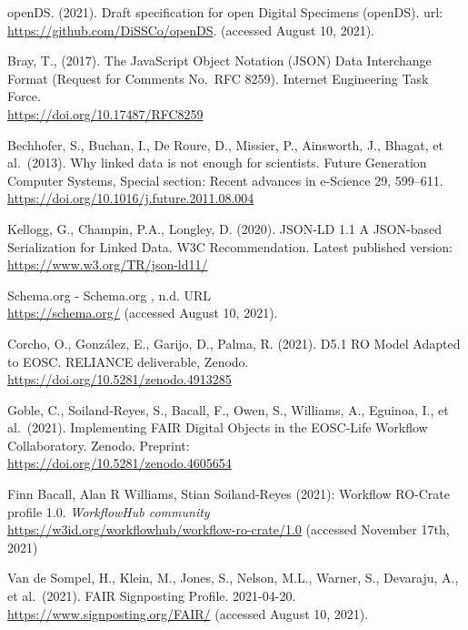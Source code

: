 \begin{thebibliography}{9}
 openDS. (2021). Draft specification for open Digital Specimens
(openDS). url:\\
\url{https://github.com/DiSSCo/openDS}. (accessed August 10, 2021).

 Bray, T., (2017). The JavaScript Object Notation (JSON) Data
Interchange Format (Request for Comments No.~RFC 8259). Internet
Engineering Task Force.\\
\url{https://doi.org/10.17487/RFC8259}

 Bechhofer, S., Buchan, I., De Roure, D., Missier, P.,
Ainsworth, J., Bhagat, et al.~(2013). Why linked data is not enough for
scientists. Future Generation Computer Systems, Special section: Recent
advances in e-Science 29, 599--611.\\
\url{https://doi.org/10.1016/j.future.2011.08.004}

 Kellogg, G., Champin, P.A., Longley, D. (2020). JSON-LD 1.1 A
JSON-based Serialization for Linked Data. W3C Recommendation. Latest
published version:\\
\url{https://www.w3.org/TR/json-ld11/}

 Schema.org - Schema.org , n.d. URL\\
\url{https://schema.org/} (accessed August 10, 2021).

 Corcho, O., González, E., Garijo, D., Palma, R. (2021). D5.1 RO
Model Adapted to EOSC. RELIANCE deliverable, Zenodo.\\
\url{https://doi.org/10.5281/zenodo.4913285}

 Goble, C., Soiland-Reyes, S., Bacall, F., Owen, S., Williams,
A., Eguinoa, I., et al.~(2021). Implementing FAIR Digital Objects in the
EOSC-Life Workflow Collaboratory. Zenodo. Preprint:\\
\url{https://doi.org/10.5281/zenodo.4605654}

 Finn Bacall, Alan R Williams, Stian Soiland-Reyes (2021):
Workflow RO-Crate profile 1.0. \emph{WorkflowHub community}\\
\url{https://w3id.org/workflowhub/workflow-ro-crate/1.0} (accessed
November 17th, 2021)

 Van de Sompel, H., Klein, M., Jones, S., Nelson, M.L., Warner,
S., Devaraju, A., et al.~(2021). FAIR Signposting Profile. 2021-04-20.\\
\url{https://www.signposting.org/FAIR/} (accessed August 10, 2021).


\end{thebibliography}
